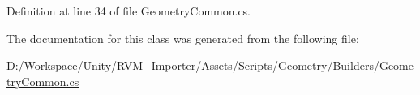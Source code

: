 Definition at line 34 of file Geometry\+Common.\+cs.



The documentation for this class was generated from the following file\+:\begin{DoxyCompactItemize}
\item 
D\+:/\+Workspace/\+Unity/\+R\+V\+M\+\_\+\+Importer/\+Assets/\+Scripts/\+Geometry/\+Builders/\mbox{\hyperlink{_geometry_common_8cs}{Geometry\+Common.\+cs}}\end{DoxyCompactItemize}
